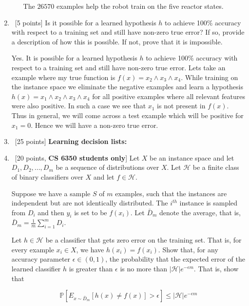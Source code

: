 \begin{enumerate}
\begin{enumerate}
\begin{solution}
The $26570$ examples help the robot train on the five reactor states.
\end{solution}
  \end{enumerate}


\item ~[5 points] Is it possible for a learned hypothesis $h$ to
   achieve 100\% accuracy with respect to a training set and still
   have non-zero true error? If so, provide a description of how this
   is possible. If not, prove that it is impossible.
\begin{solution}
Yes. It is possible for a learned hypothesis $h$ to achieve 100\% accuracy with respect to a training set and still have non-zero true error. Lets take an example where my true function is $f(x) = x_2\land x_3 \land x_4$. While training  on the instance space we eliminate the negative examples and learn a hypothesis $h(x) = x_1 \land x_2 \land x_3 \land x_4$ for all positive examples where all relevant features were also positive. In such a case we see that $x_1$ is not present in $f(x)$. Thus in general, we will come across a test example which will be positive for $x_1 = 0$. Hence we will have a non-zero true error.
\end{solution}

\item ~[25 points] {\bf Learning decision lists:}
  

\item ~[20 points, {\bf CS 6350 students only}] Let $X$ be an instance
  space and let $D_1,D_2,...,D_m$ be a sequence of distributions over
  $X$. Let $\mathcal{H}$ be a finite class of binary classifiers over
  $X$ and let $f\in \mathcal{H}$. 

  Suppose we have a sample $S$ of $m$ examples, such that the
  instances are independent but are not identically distributed. The
  $i^{th}$ instance is sampled from $D_i$ and then $y_i$ is set to be
  $f(x_i)$. Let $\bar{D}_m$ denote the average, that is,
  $\bar{D}_m = \frac{1}{m}\sum_{i=1}^m D_i$. 

  Let $h \in \mathcal{H}$ be a classifier that gets zero error on the
  training set. That is, for every example $x_i \in X$, we have
  $h(x_i) = f(x_i)$. Show that, for any accuracy parameter
  $\epsilon \in (0, 1)$, the probability that the expected error of
  the learned classifier $h$ is greater than $\epsilon$ is no more
  than $|\mathcal{H}|e^{-\epsilon m}$. That is, show that

  \[\mathbb{P}\left[E_{x \sim \bar{D}_m}\left[h(x) \ne f(x)\right]> \epsilon\right] \leq  |\mathcal{H}|e^{-\epsilon m}\]


\end{enumerate}
